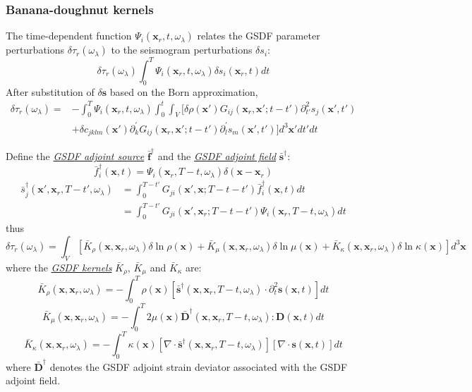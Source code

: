\documentclass{article}
\newcommand{\mbf}[1]{\mathbf{#1}}
\newcommand{\mynem}[1]{\textsl{\uline{#1}}}
\begin{document}
\subsubsection{Banana-doughnut kernels}
The time-dependent function $\Psi_i(\mbf x_r,t,\omega_\lambda)$ relates the GSDF parameter perturbations $\delta\tau_r(\omega_\lambda)$ to the seismogram perturbations $\delta s_i$:
\[ \delta\tau_r(\omega_\lambda)\int_0^T\Psi_i(\mbf x_r,t,\omega_\lambda)\delta s_i(\mbf x_r,t)dt \]
After substitution of $\delta\mbf s$ based on the Born approximation,
\begin{align*}
  \delta\tau_r(\omega_\lambda)= & -\int_0^T\Psi_i(\mbf x_r,t,\omega_\lambda)\int_0^t\int_V[\delta\rho(\mbf x')G_{ij}(\mbf x_r,\mbf x';t-t')\partial_{t'}^2s_j(\mbf x',t') \\
    & +\delta c_{jklm}(\mbf x')\partial_k^\prime G_{ij}(\mbf x_r,\mbf x';t-t')\partial_l^\prime s_m(\mbf x',t')]d^3\mbf x'dt'dt
\end{align*}\par
Define the \mynem{GSDF adjoint source} $\bar{\mbf f}^\dagger$ and the \mynem{GSDF adjoint field} $\bar{\mbf s}^\dagger$:
\[ \bar f_i^\dagger(\mbf x,t)=\Psi_i(\mbf x_r,T-t,\omega_\lambda)\delta(\mbf x-\mbf x_r) \]
\begin{align*}
  \bar s_j^\dagger(\mbf x',\mbf x_r,T-t',\omega_\lambda) & =\int_0^{T-t'}G_{ji}(\mbf x',\mbf x;T-t-t')\bar f_i^\dagger(\mbf x,t)dt \\
    & =\int_0^{T-t'}G_{ji}(\mbf x',\mbf x_r;T-t-t')\Psi_i(\mbf x_r,T-t,\omega_\lambda)dt
\end{align*}
thus
\[ \delta\tau_r(\omega_\lambda)=\int_V[\bar K_\rho(\mbf x,\mbf x_r,\omega_\lambda)\delta\ln\rho(\mbf x)+\bar K_\mu(\mbf x,\mbf x_r,\omega_\lambda)\delta\ln\mu(\mbf x)+\bar K_\kappa(\mbf x,\mbf x_r,\omega_\lambda)\delta\ln\kappa(\mbf x)]d^3\mbf x \]
where the \mynem{GSDF kernels} $\bar K_\rho$, $\bar K_\mu$ and $\bar K_\kappa$ are:
\[ \bar K_\rho(\mbf x,\mbf x_r,\omega_\lambda)=-\int_0^T\rho(\mbf x)[\bar{\mbf s}^\dagger(\mbf x,\mbf x_r,T-t,\omega_\lambda)\cdot\partial_t^2\mbf s(\mbf x,t)]dt \]
\[ \bar K_\mu(\mbf x,\mbf x_r,\omega_\lambda)=-\int_0^T2\mu(\mbf x)\bar{\mbf D}^\dagger(\mbf x,\mbf x_r,T-t,\omega_\lambda):\mbf D(\mbf x,t)dt \]
\[ \bar K_\kappa(\mbf x,\mbf x_r,\omega_\lambda)=-\int_0^T\kappa(\mbf x)[\nabla\cdot\bar{\mbf s}^\dagger(\mbf x,\mbf x_r,T-t,\omega_\lambda)][\nabla\cdot\mbf s(\mbf x,t)]dt \]
where $\bar{\mbf D}^\dagger$ denotes the GSDF adjoint strain deviator associated with the GSDF adjoint field.\par
\end{document}
